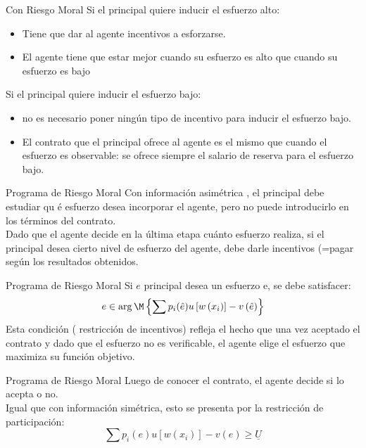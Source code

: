 \begin{frame}{Con Riesgo Moral}
	Si el principal quiere inducir el esfuerzo alto:
		\begin{itemize}
			\item Tiene que dar al agente incentivos a esforzarse.
			\item El agente tiene que estar mejor cuando su esfuerzo es alto que cuando su esfuerzo es bajo
		\end{itemize}
	Si el principal quiere inducir el esfuerzo bajo:
		\begin{itemize}
			\item no es necesario poner ningún tipo de incentivo para inducir el esfuerzo bajo.
			\item El contrato que el principal ofrece al agente es el mismo que cuando el esfuerzo es observable: se ofrece siempre el salario de reserva para el esfuerzo bajo.
		\end{itemize}
\end{frame}
\begin{frame}{Programa de Riesgo Moral}
	Con información asimétrica , el principal debe estudiar qu é esfuerzo desea incorporar el agente, pero no puede introducirlo en los términos del contrato.\\
	
	Dado que el agente decide en la última etapa cuánto esfuerzo realiza, si el principal desea cierto nivel de esfuerzo del agente, debe darle incentivos (=pagar según los resultados obtenidos.
\end{frame}
\begin{frame}{Programa de Riesgo Moral}
	Si $e$ principal desea un esfuerzo e, se debe satisfacer:
		$$ e \in \arg \M \left\lbrace \sum p_i(\hat{e})u\left[ w\left( x_i\right) \right] - v\left( \hat{e}\right) \right\rbrace $$
	Esta condición ( restricción de incentivos) refleja el hecho que una vez aceptado el contrato y dado que el esfuerzo no es verificable, el agente elige el esfuerzo que maximiza su función objetivo.
\end{frame}
\begin{frame}{Programa de Riesgo Moral}
	Luego de conocer el contrato, el agente decide si lo acepta o no.\\
	
	Igual que con información simétrica, esto se presenta por la restricción de participación:
		$$\sum p_i(e)u\left[ w\left( x_i\right) \right] - v\left( e\right) \geq \underline{U}$$
\end{frame}
